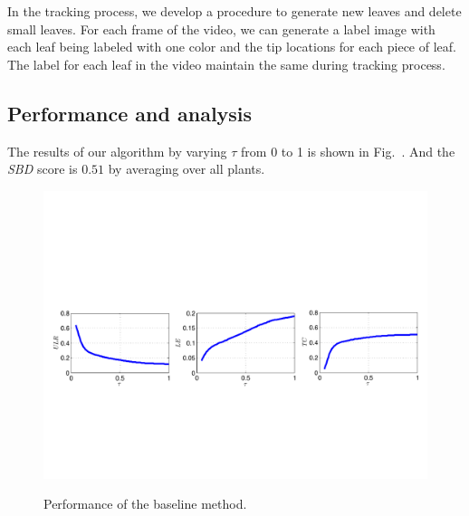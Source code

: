 In the tracking process, we develop a procedure to generate new leaves and delete small leaves.
For each frame of the video, we can generate a label image with each leaf being labeled with one color and the tip locations for each piece of leaf.
The label for each leaf in the video maintain the same during tracking process.


\subsection{Performance and analysis}
The results of our algorithm by varying $\tau$ from 0 to 1 is shown in Fig.~.
And the {\it{SBD}} score is $0.51$ by averaging over all plants.

\begin{figure}
\centering
\includegraphics[width=.98\textwidth]{Figures/performance}\\
\caption{Performance of the baseline method.}
\label{fig:performance}
\end{figure}



